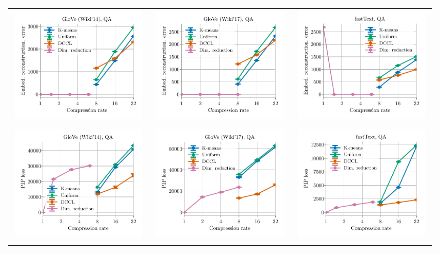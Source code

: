 \begin{figure}
	\footnotesize
	\centering
	\begin{tabular}{@{\hskip -0.0in}c@{\hskip -0.0in}c@{\hskip -0.0in}c@{\hskip -0.0in}}
		\includegraphics[width=.245\linewidth]{figures/glove400k_synthetics_embed-frob-error_vs_compression_linx_stoc.pdf} &
		\includegraphics[width=.245\linewidth]{figures/glove-wiki400k-am_synthetics_embed-frob-error_vs_compression_linx_stoc.pdf} &
		\includegraphics[width=.245\linewidth]{figures/fasttext1m_synthetics_embed-frob-error_vs_compression_linx_stoc.pdf}	\\
		\includegraphics[width=.245\linewidth]{figures/glove400k_synthetics-large-dim_gram-large-dim-frob-error_vs_compression_linx_stoc.pdf} &
		\includegraphics[width=.245\linewidth]{figures/glove-wiki400k-am_synthetics-large-dim_gram-large-dim-frob-error_vs_compression_linx_stoc.pdf} &
		\includegraphics[width=.245\linewidth]{figures/fasttext1m_synthetics-large-dim_gram-large-dim-frob-error_vs_compression_linx_stoc.pdf}	\\

\end{tabular}
\end{figure}
